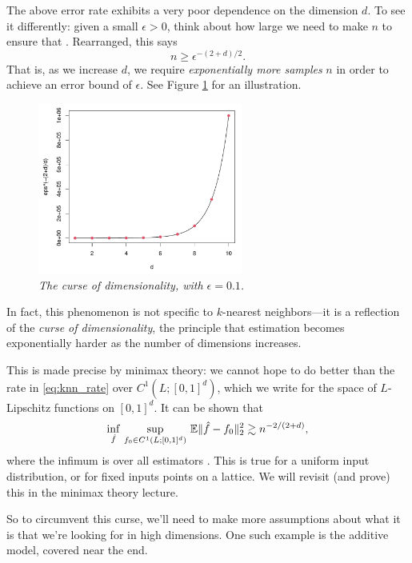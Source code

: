\documentclass{article}
\begin{document}
The above error rate  exhibits a very poor dependence on
the dimension $d$.  To see it differently: given a small $\epsilon>0$, think
about how large we need to make $n$ to ensure that . Rearranged, this says 
\[
n \geq \epsilon^{-(2+d)/2}.
\] 
That is, as we increase $d$, we require \emph{exponentially more samples} $n$ in
order to achieve an error bound of $\epsilon$. See Figure \ref{fig:curse} for an
illustration.

\begin{figure}[tb]
\centering
\includegraphics[width=0.6\textwidth]{curse.pdf}
\caption{\it The curse of dimensionality, with $\epsilon=0.1$.} 
\label{fig:curse}
\end{figure}

In fact, this phenomenon is not specific to $k$-nearest neighbors---it is a 
reflection of the \emph{curse of dimensionality}, the principle that estimation
becomes exponentially harder as the number of dimensions increases. 

This is made precise by minimax theory: we cannot hope to do better than the
rate in \eqref{eq:knn_rate} over $C^1(L; [0,1]^d)$, which we write for the space 
of $L$-Lipschitz functions on $[0,1]^d$. It can be shown that
\begin{equation}
\label{eq:lipschitz_lbd}
\inf_{\hat{f}} \, \sup_{f_0 \in C^1(L; [0,1]^d)} \, \mathbb{E}\|\hat{f} - f_0\|_2^2   
\gtrsim n^{-2/(2+d)},
\end{equation}
where the infimum is over all estimators \smash{$\hf$}. This is true for a
uniform input distribution, or for fixed inputs points on a lattice. We will 
revisit (and prove) this in the minimax theory lecture.    

So to circumvent this curse, we'll need to make more assumptions about what it
is that we're looking for in high dimensions. One such example is the additive
model, covered near the end.
\end{document}

